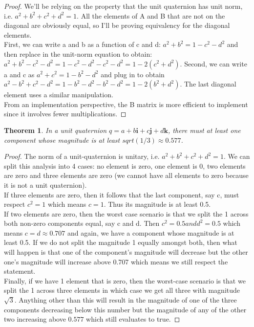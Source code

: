 \documentclass[a4paper,12pt]{article}
\newtheorem{theorem}{Theorem}
\begin{document}
\begin{proof}
We'll be relying on the property that the unit quaternion has unit norm, i.e. $a^2 + b^2 + c^2 + d^2 = 1$. All the elements of A and B that are not on the diagonal are obviously equal, so I'll be proving equivalency for the diagonal elements. \\

First, we can write a and b as a function of c and d: $a^2 + b^2 = 1 - c^2 - d^2$ and then replace in the unit-norm equation to obtain: $a^2 + b^2 - c^2 - d^2 = 1 - c^2 - d^2 - c^2 - d^2 = 1 - 2(c^2 + d^2)$. Second, we can write a and c as $a^2 + c^2 = 1 - b^2 - d^2$ and plug in to obtain $a^2 - b^2 + c^2 - d^2 = 1 - b^2 - d^2 - b^2 - d^2 = 1 - 2(b^2 + d^2)$. The last diagonal element uses a similar manipulation. \\

From an implementation perspective, the B matrix is more efficient to implement since it involves fewer multiplications.
\end{proof}

\begin{theorem}
In a unit quaternion  $q = a + b\mathbf{i} + c\mathbf{j} + d\mathbf{k}$, there must at least one component whose magnitude is at least $sqrt(1 / 3) \approx 0.577$.
\end{theorem}

\begin{proof}
The norm of a unit-quaternion is unitary, i.e. $a^2 + b^2 + c^2 + d^2 = 1$. We can split this analysis into 4 cases: no element is zero, one element is 0, two elements are zero and three elements are zero (we cannot have all elements to zero because it is not a unit quaternion). \\

If three elements are zero, then it follows that the last component, say c, must respect $c^2 = 1$ which means $c=1$. Thus its magnitude is at least 0.5. \\

If two elements are zero, then the worst case scenario is that we split the 1 across both non-zero components equal, say c and d. Then $c^2 = 0.5 and d^2 = 0.5$ which means $c = d \approx 0.707$ and again, we have a component whose magnitude is at least 0.5. If we do not split the magnitude 1 equally amongst both, then what will happen is that one of the component's magnitude will decrease but the other one's magnitude will increase above 0.707 which means we still respect the statement. \\

Finally, if we have 1 element that is zero, then the worst-case scenario is that we split the 1 across three elements in which case we get all three with magnitude $\sqrt{3}$. Anything other than this will result in the magnitude of one of the three components decreasing below this number but the magnitude of any of the other two increasing above $0.577$ which still evaluates to true.
\end{proof}
\end{document}
